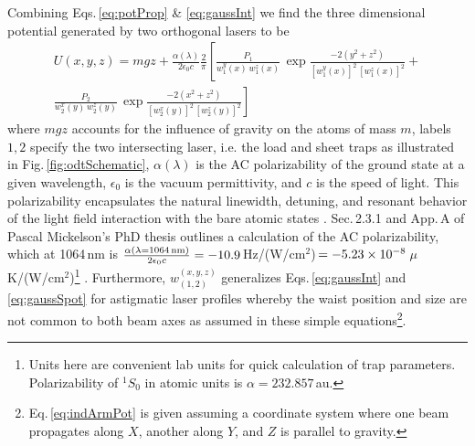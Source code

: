 Combining Eqs.\,\ref{eq:potProp} \& \ref{eq:gaussInt} we find the three dimensional potential generated by two orthogonal lasers to be
\begin{equation} \label{eq:indArmPot}
\begin{split}
	U(x,y,z) = m g z + \frac{\alpha(\lambda)}{2 \epsilon_0 c} \frac{2}{\pi} \left[ \frac{P_1}{w_1^y(x)\, w_1^z(x)} \, \exp{\frac{-2 (y^2+z^2)}{[w_1^y(x)]^2 \,[w_1^z(x)]^2}} + \right. \\
	\left. \frac{P_2}{w_2^x(y)\, w_2^z(y)} \,\exp{\frac{-2 (x^2+z^2)}{[w_2^x(y)]^2\,[w_2^z(y)]^2}} \right]
\end{split}
\end{equation}
where $mgz$ accounts for the influence of gravity on the atoms of mass $m$, labels $1,2$ specify the two intersecting laser, i.e. the load and sheet traps as illustrated in Fig.\,\ref{fig:odtSchematic}, $\alpha(\lambda)$ is the AC polarizability of the ground state at a given wavelength, $\epsilon_0$ is the vacuum permittivity, and $c$ is the speed of light.
This polarizability encapsulates the natural linewidth, detuning, and resonant behavior of the light field interaction with the bare atomic states \cite{Grimm1999a}.
Sec.\,2.3.1 and App.\,A of Pascal Mickelson's PhD thesis \cite{Mickelson2010b} outlines a calculation of the AC polarizability, which at 1064\,nm is $\frac{\alpha( \lambda = \text{1064\,nm} )}{2 \epsilon_0 c} = -10.9$\,Hz/(W/cm$^2$)\,$=-5.23\times 10^{-8}$\,$\mu$K/(W/cm$^2$)\footnote{Units here are convenient lab units for quick calculation of trap parameters. Polarizability of $^1S_0$ in atomic units is $\alpha = 232.857$\,au.}  \cite{Ye2008}.
Furthermore, $w_{(1,2)}^{(x,y,z)}$ generalizes Eqs.\,\ref{eq:gaussInt} and \ref{eq:gaussSpot} for astigmatic laser profiles whereby the waist position and size are not common to both beam axes as assumed in these simple equations\footnote{Eq.\,\ref{eq:indArmPot} is given assuming a coordinate system where one beam propagates along $X$, another along $Y$, and $Z$ is parallel to gravity.}.

